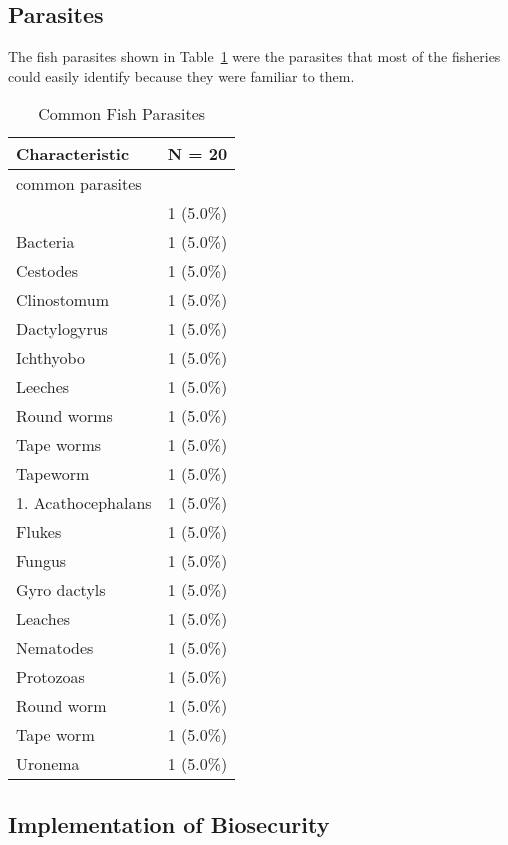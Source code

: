 \documentclass[
  letterpaper,
  DIV=11,
  numbers=noendperiod]{scrartcl}
\begin{document}
\subsection{Parasites}\label{parasites}

The fish parasites shown in Table~\ref{tbl-parasites} were the parasites
that most of the fisheries could easily identify because they were
familiar to them.

\begin{longtable}[]{@{}lc@{}}

\caption{\label{tbl-parasites}Common Fish Parasites}

\tabularnewline

\toprule\noalign{}
\textbf{Characteristic} & \textbf{N = 20} \\
\midrule\noalign{}
\endhead
\bottomrule\noalign{}
\endlastfoot
common parasites & \\
& 1 (5.0\%) \\
Bacteria & 1 (5.0\%) \\
Cestodes & 1 (5.0\%) \\
Clinostomum & 1 (5.0\%) \\
Dactylogyrus & 1 (5.0\%) \\
Ichthyobo & 1 (5.0\%) \\
Leeches & 1 (5.0\%) \\
Round worms & 1 (5.0\%) \\
Tape worms & 1 (5.0\%) \\
Tapeworm & 1 (5.0\%) \\
1. Acathocephalans & 1 (5.0\%) \\
Flukes & 1 (5.0\%) \\
Fungus & 1 (5.0\%) \\
Gyro dactyls & 1 (5.0\%) \\
Leaches & 1 (5.0\%) \\
Nematodes & 1 (5.0\%) \\
Protozoas & 1 (5.0\%) \\
Round worm & 1 (5.0\%) \\
Tape worm & 1 (5.0\%) \\
Uronema & 1 (5.0\%) \\

\end{longtable}

\subsection{Implementation of
Biosecurity}\label{implementation-of-biosecurity}
\end{document}
